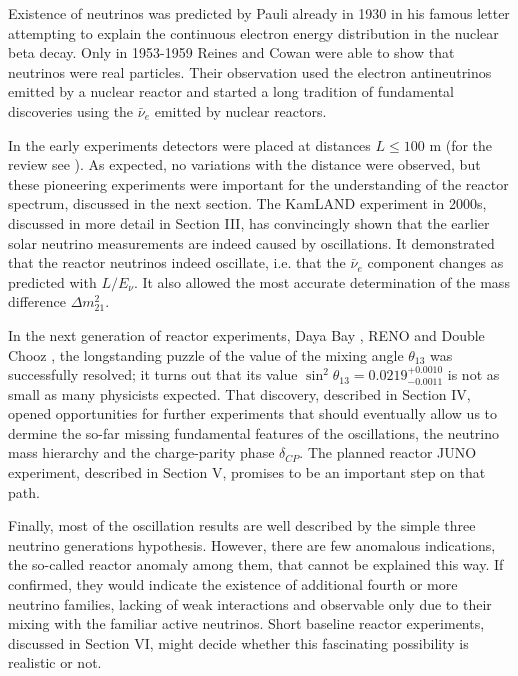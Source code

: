 Existence of neutrinos was predicted by Pauli already in 1930 \cite{Pauli30} in his famous letter attempting to explain the continuous electron
energy distribution in the nuclear beta decay. Only in 1953-1959 Reines and Cowan \cite{Reines53,Cowan56,Reines59} were able to show that neutrinos
were real particles. Their observation used the electron antineutrinos emitted by a nuclear reactor and started a long tradition of fundamental
discoveries using the $\bar{\nu}_e$ emitted by nuclear reactors.

In the early experiments detectors were placed at distances $L \le 100$ m (for the review see \cite{Bemporad02}). As expected, no variations
with the distance were observed, but these pioneering experiments were important for the understanding of the reactor spectrum, discussed
in the next section. The KamLAND experiment \cite{Kamland03,Kamland05,Kamland08} in 2000s, discussed in more detail in Section III, has convincingly shown that the earlier
solar neutrino measurements are indeed  caused by oscillations. It demonstrated that the reactor neutrinos indeed
oscillate, i.e. that the $\bar{\nu}_e$ component changes as predicted with $L/E_{\nu}$. It also allowed the most accurate determination of the 
mass difference $\Delta m^2_{21}$.  

In the next generation of reactor experiments, Daya Bay \cite{Dayabay,Dayabay14}, RENO \cite{Reno}  and Double Chooz \cite{DChooz,DChooz14}, the longstanding puzzle of the
value of the mixing angle $\theta_{13}$ was successfully resolved; it turns out that its value $\sin^2 \theta_{13} = 0.0219^{+0.0010}_{-0.0011}$ 
is not as small as many physicists expected. That discovery, described in Section IV, opened opportunities for further experiments that should  
eventually allow us to dermine the so-far missing fundamental features of the oscillations, the neutrino mass hierarchy and the charge-parity phase
$\delta_{CP}$. The planned reactor JUNO \cite{JUNO} experiment, described in Section V,  promises to be an important step on that path.

Finally, most of the oscillation results are well described by the simple three neutrino generations hypothesis. However, there are few anomalous indications,
the so-called reactor anomaly \cite{Mention} among them, that cannot be explained this way. If confirmed, they would indicate the existence of additional
fourth or more neutrino families, lacking of weak interactions and observable only due to their mixing with the familiar active neutrinos.  Short baseline
reactor experiments, discussed in Section VI, might decide whether this fascinating possibility is realistic or not.
